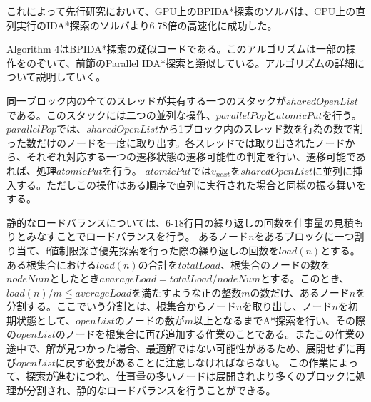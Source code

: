 \documentclass[a4paper,11pt,oneside,openany]{jsbook}
\begin{document}
これによって先行研究\cite{HA17}において、GPU上のBPIDA*探索のソルバは、CPU上の直列実行のIDA*探索のソルバより6.78倍の高速化に成功した。

Algorithm 4はBPIDA*探索の疑似コードである。このアルゴリズムは一部の操作をのぞいて、前節のParallel IDA*探索と類似している。アルゴリズムの詳細について説明していく。

同一ブロック内の全てのスレッドが共有する一つのスタックが$sharedOpenList$である。このスタックには二つの並列な操作、$parallelPop$と$atomicPut$を行う。$parallelPop$では、$sharedOpenList$から1ブロック内のスレッド数を行為の数で割った数だけのノードを一度に取り出す。各スレッドでは取り出されたノードから、それぞれ対応する一つの遷移状態の遷移可能性の判定を行い、遷移可能であれば、処理$atomicPut$を行う。
$atomicPut$では$v_{next}$を$sharedOpenList$に並列に挿入する。ただしこの操作はある順序で直列に実行された場合と同様の振る舞いをする。

静的なロードバランスについては、6-18行目の繰り返しの回数を仕事量の見積もりとみなすことでロードバランスを行う。
あるノード$n$をあるブロックに一つ割り当て、f値制限深さ優先探索を行った際の繰り返しの回数を$load(n)$とする。ある根集合における$load(n)$の合計を$totalLoad$、根集合のノードの数を$nodeNum$としたとき$avarageLoad = totalLoad / nodeNum$とする。このとき、$load(n) / m \leqq averageLoad$を満たすような正の整数$m$の数だけ、あるノード$n$を分割する。ここでいう分割とは、根集合からノード$n$を取り出し、ノード$n$を初期状態として、$openList$のノードの数が$m$以上となるまでA*探索を行い、その際の$openList$のノードを根集合に再び追加する作業のことである。またこの作業の途中で、解が見つかった場合、最適解ではない可能性があるため、展開せずに再び$openList$に戻す必要があることに注意しなければならない。
この作業によって、探索が進むにつれ、仕事量の多いノードは展開されより多くのブロックに処理が分割され、静的なロードバランスを行うことができる。
\end{document}
